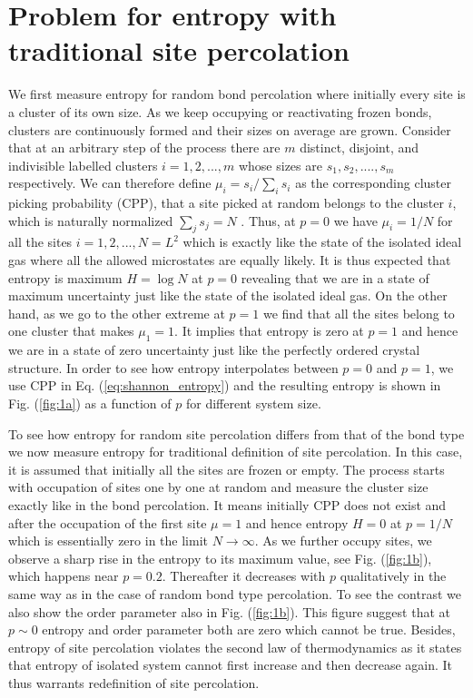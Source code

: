 \documentclass[twocolumn,showpacs,preprintnumbers,amsmath,amssymb]{article}
\begin{document}
\section{Problem for entropy with traditional site percolation}

We first measure entropy for random bond percolation
where initially every site is a cluster of its own size. As 
we keep occupying or reactivating frozen bonds, clusters are continuously formed and
their sizes on average are grown. Consider that at an arbitrary step of the process
there are $m$ distinct, disjoint, and indivisible labelled clusters $i=1,2,...,m$ 
whose sizes are $s_1,s_2,....,s_m$ respectively. We can therefore define 
 $\mu_i=s_i/\sum_i s_i$ as the corresponding cluster picking probability (CPP),
that a site picked at random belongs to the cluster $i$, which is naturally normalized  $\sum_j s_j=N$  
\cite{ref.hassan_didar, ref.Hassan_Rahman_1}. Thus, at $p=0$ we have 
$\mu_i=1/N$ for all the sites $i=1,2,...,N=L^2$ which is exactly like the state 
of the isolated ideal gas where all the allowed microstates are equally likely.
It is thus expected that entropy is maximum $H=\log N$ at $p=0$ revealing  that we are in a state of 
maximum uncertainty just like the state of the isolated ideal gas.  
On the other hand, as we go to the other extreme at $p=1$ we find that all the 
sites belong to one cluster that makes  $\mu_1=1$. It implies
that entropy is zero at $p=1$ and hence we are in a state of zero uncertainty just like the perfectly 
ordered crystal structure. In order to see how entropy interpolates between $p=0$ and $p=1$,
we use CPP in Eq. (\ref{eq:shannon_entropy}) and the resulting entropy is shown
in  Fig. (\ref{fig:1a}) as a function of $p$ for different system size. 







To see how entropy for random site percolation 
differs from that of the bond type we now measure entropy for traditional definition of site percolation. In this case,
 it is assumed that initially all the sites are frozen or empty.
The process starts with occupation of sites one by one at random and measure
the cluster size exactly like in the bond percolation.
It means initially CPP does not exist and after the occupation of the first site $\mu=1$ 
and hence entropy $H=0$ at $p=1/N$ which is essentially zero
in the limit $N\rightarrow \infty$.
As we further occupy sites, we observe a sharp rise in the entropy to its maximum value, 
see Fig. (\ref{fig:1b}), which happens near $p=0.2$. Thereafter it decreases 
with $p$ qualitatively in the same way as in the case of random bond type percolation. To see the
contrast we also show the order parameter also in Fig. (\ref{fig:1b}). This figure
suggest that at $p\sim 0$ entropy and order parameter  both 
are zero which cannot be true. Besides, entropy of site percolation violates
the second law of thermodynamics as it states that entropy of isolated system cannot first
increase and then decrease again. It thus warrants redefinition of site percolation. 
\end{document}
